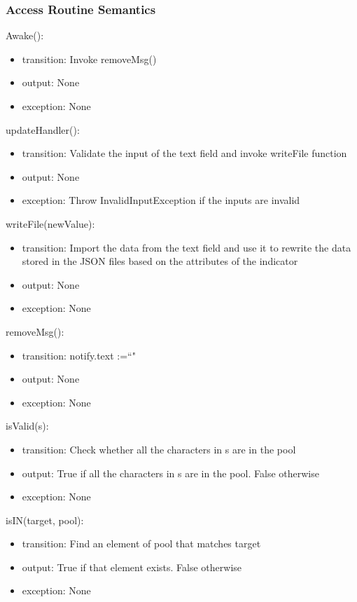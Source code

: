 \documentclass[12pt, titlepage]{article}
\begin{document}
\subsubsection{Access Routine Semantics}
Awake():
\begin{itemize}
    \item transition: Invoke removeMsg()
    \item output: None
    \item exception: None
\end{itemize}
updateHandler():
\begin{itemize}
    \item transition: Validate the input of the text field and invoke writeFile function
    \item output: None
    \item exception: Throw InvalidInputException if the inputs are invalid
\end{itemize}
writeFile(newValue):
\begin{itemize}
    \item transition: Import the data from the text field and use it to rewrite the data stored in the JSON files based on the attributes of the indicator
    \item output: None                             
    \item exception: None
\end{itemize}
removeMsg():
\begin{itemize}
    \item transition: notify.text :=``"
    \item output: None
    \item exception: None
\end{itemize}
isValid(s):
\begin{itemize}
    \item transition: Check whether all the characters in s are in the pool
    \item output: True if all the characters in s are in the pool. False otherwise
    \item exception: None
\end{itemize}
isIN(target, pool):
\begin{itemize}
    \item transition: Find an element of pool that matches target
    \item output: True if that element exists. False otherwise
    \item exception: None
\end{itemize}
\end{document}
